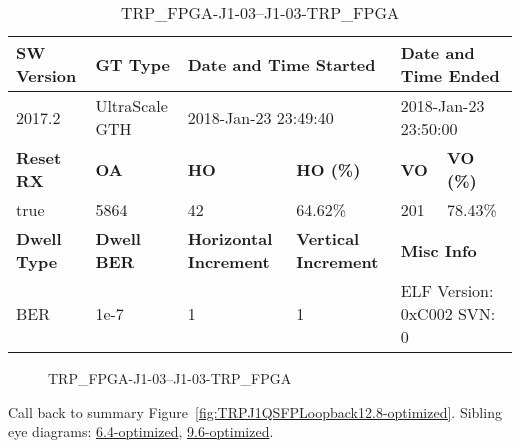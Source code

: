 \begin{table}[h]
\centering
\caption{TRP\_FPGA-J1-03--J1-03-TRP\_FPGA}
\label{tab:TRPFPGAJ103J103TRPFPGA12.8-optimized}
\begin{tabular}{@{}|l|l|l|l|l|l|@{}}
\toprule
\textbf{SW Version}                & \textbf{GT Type}   & \multicolumn{2}{l|}{\textbf{Date and Time Started}}            & \multicolumn{2}{l|}{\textbf{Date and Time Ended}}        \\ \midrule
2017.2                       & UltraScale GTH          & \multicolumn{2}{l|}{2018-Jan-23 23:49:40}                   & \multicolumn{2}{l|}{2018-Jan-23 23:50:00}               \\ \midrule
\textbf{Reset RX}                  & \textbf{OA} & \textbf{HO}   & \textbf{HO (\%)} & \textbf{VO} & \textbf{VO (\%)} \\ \midrule
true & 5864        & 42          & 64.62\%        & 201        & 78.43\%       \\ \midrule
\textbf{Dwell Type}                & \textbf{Dwell BER} & \textbf{Horizontal Increment} & \textbf{Vertical Increment}    & \multicolumn{2}{l|}{\textbf{Misc Info}}                  \\ \midrule
BER                            & 1e-7        & 1        & 1           & \multicolumn{2}{l|}{ELF Version: 0xC002 SVN: 0}                         \\ \bottomrule
\end{tabular}
\end{table}

\begin{figure}[h]
\caption{TRP\_FPGA-J1-03--J1-03-TRP\_FPGA} \label{fig:TRPFPGAJ103J103TRPFPGA12.8-optimized}
\end{figure}

Call back to summary Figure~\ref{fig:TRPJ1QSFPLoopback12.8-optimized}.
Sibling eye diagrams: \hyperref[sec:TRPFPGAJ103J103TRPFPGA6.4-optimized]{6.4-optimized}, \hyperref[sec:TRPFPGAJ103J103TRPFPGA9.6-optimized]{9.6-optimized}.

\clearpage
\newpage

